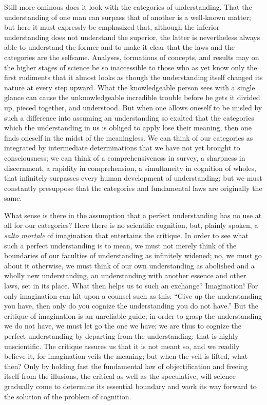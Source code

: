 \documentclass[12pt]{book}
\begin{document}
Still more ominous does it look with the categories of understanding. That the
understanding of one man can surpass that of another is a well-known matter;
but here it must expressly be emphasized that, although the inferior
understanding does not understand the superior, the latter is nevertheless
always able to understand the former and to make it clear that the laws and the
categories are the selfsame. Analyses, formations of concepts, and results may
on the higher stages of science be so inaccessible to those who as yet know
only the first rudiments that it almost looks as though the understanding
itself changed its nature at every step upward. What the knowledgeable person
sees with a single glance can cause the unknowledgeable incredible trouble
before he gets it divided up, pieced together, and understood. But when one
allows oneself to be misled by such a difference into assuming an understanding
so exalted that the categories which the understanding in us is obliged to
apply lose their meaning, then one finds oneself in the midst of the
meaningless. We can think of our categories as integrated by intermediate
determinations that we have not yet brought to consciousness; we can think of a
comprehensiveness in survey, a sharpness in discernment, a rapidity in
comprehension, a simultaneity in cognition of wholes, that infinitely surpasses
every human development of understanding; but we must constantly presuppose
that the categories and fundamental laws are originally the same.

What sense is there in the assumption that a perfect understanding has no use
at all for our categories? Here there is no scientific cognition, but, plainly
spoken, a \textit{salto mortale} of imagination that entertains the critique. In
order to see what such a perfect understanding is to mean, we must not merely
think of the boundaries of our faculties of understanding as infinitely widened;
no, we must go about it otherwise, we must think of our own understanding as
abolished and a wholly new understanding, an understanding with another essence
and other laws, set in its place. What then helps us to such an exchange?
Imagination! For only imagination can hit upon a counsel such as this: ``Give
up the understanding you have, then only do you cognize the understanding you do
not have.'' But the critique of imagination is an unreliable guide; in order to
grasp the understanding we do not have, we must let go the one we have; we are
thus to cognize the perfect understanding by departing from the understanding:
that is highly unscientific. The critique assures us that it is not meant so,
and we readily believe it, for imagination veils the meaning; but when the veil
is lifted, what then? Only by holding fast the fundamental law of
objectification and freeing itself from the illusions, the critical as well as
the speculative, will science gradually come to determine its essential
boundary and work its way forward to the solution of the problem of cognition.
\end{document}
